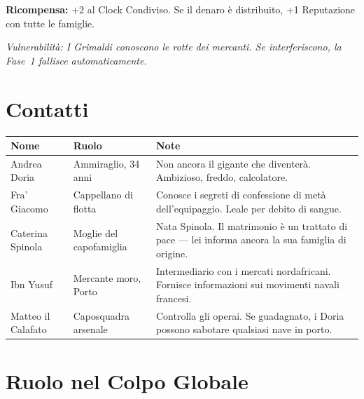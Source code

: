 
\textbf{Ricompensa:} +2 al Clock Condiviso. Se il denaro è distribuito, +1 Reputazione
con tutte le famiglie.

\textit{Vulnerabilità: I Grimaldi conoscono le rotte dei mercanti.
Se interferiscono, la Fase~1 fallisce automaticamente.}

\section{Contatti}
\label{sec:doria-contatti}


\begin{center}
\begin{tabularx}{\textwidth}{L{2.8cm} L{2.8cm} X}
  \toprule
  \textbf{Nome} & \textbf{Ruolo} & \textbf{Note} \\
  \midrule
  Andrea Doria      & Ammiraglio, 34 anni     & Non ancora il gigante che diventerà. Ambizioso, freddo, calcolatore. \\
  Fra' Giacomo      & Cappellano di flotta    & Conosce i segreti di confessione di metà dell'equipaggio. Leale per debito di sangue. \\
  Caterina Spinola  & Moglie del capofamiglia & Nata Spinola. Il matrimonio è un trattato di pace — lei informa ancora la sua famiglia di origine. \\
  Ibn Yusuf         & Mercante moro, Porto    & Intermediario con i mercati nordafricani. Fornisce informazioni sui movimenti navali francesi. \\
  Matteo il Calafato& Caposquadra arsenale    & Controlla gli operai. Se guadagnato, i Doria possono sabotare qualsiasi nave in porto. \\
  \bottomrule
\end{tabularx}
\end{center}

\section{Ruolo nel Colpo Globale}
\label{sec:doria-globale}

